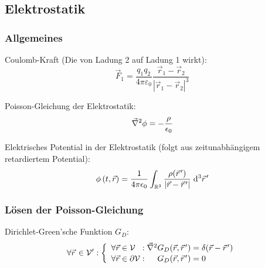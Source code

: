 \documentclass[11pt]{article}
\numberwithin{equation}{section}
\begin{document}
		\subsection{Elektrostatik}
			\subsubsection{Allgemeines}

				\noindent
				Coulomb-Kraft (Die von Ladung 2 auf Ladung 1 wirkt):
				\begin{equation}
					\vec{F}_1 = \frac{q_1 q_2}{4\pi\varepsilon_0}\frac{\vec{r}_1-\vec{r}_2}{\left|\vec{r}_1-\vec{r}_2\right|^3}
				\end{equation}

				\noindent
				Poisson-Gleichung der Elektrostatik:
				\begin{equation}
					\vec{\nabla}^2\phi = -\frac{\rho}{\epsilon_0}
				\end{equation}

				\noindent
				Elektrisches Potential in der Elektrostatik (folgt aus zeitunabhängigem retardiertem Potential):
				\begin{equation}
					\phi\left(t,\vec{r}\right)
					= \frac{1}{4\pi\epsilon_0} \int_{\mathbb{R}^3} \frac{\rho(\pvec{r}')}{\left|\vec{r}-\pvec{r}'\right|}\;\diff^3 \pvec{r}'
				\end{equation}

			\subsubsection{Lösen der Poisson-Gleichung}
				\noindent
				Dirichlet-Green'sche Funktion $G_D$:
				\begin{equation}
					\forall\pvec{r}\in\mathcal{V}': \left\{\begin{array}{ll}
							\forall\vec{r}\in\mathcal{V}\phantom\partial:
							\Nabla^2 G_D(\vec{r},\pvec{r}') = \delta(\vec{r}-\pvec{r}') \\
							\forall\vec{r}\in\partial\mathcal{V}:
							\phantom{\Nabla^2}G_D(\vec{r},\pvec{r}') = 0
						\end{array}\right.
				\end{equation}
\end{document}
